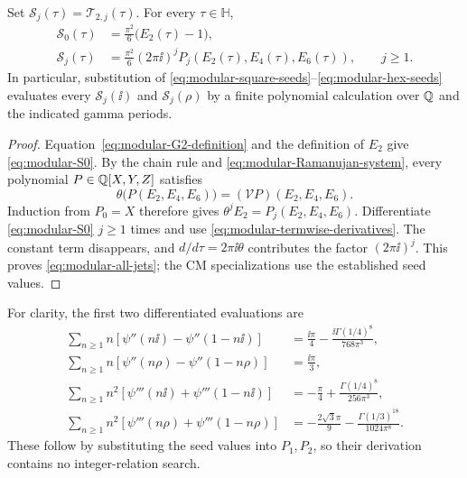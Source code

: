 \begin{theorem}
\label{thm:modular-all-jets}
Set \(\mathcal S_j(\tau)=\mathcal T_{2,j}(\tau)\). For every
\(\tau\in\mathbb H\),
\begin{align}
\mathcal S_0(\tau)&=\frac{\pi^2}{6}\bigl(E_2(\tau)-1\bigr),
\label{eq:modular-S0}\\
\mathcal S_j(\tau)&=\frac{\pi^2}{6}(2\pi\ii)^j
 P_j(E_2(\tau),E_4(\tau),E_6(\tau)),\qquad j\ge1.
\label{eq:modular-all-jets}
\end{align}
In particular, substitution of
\eqref{eq:modular-square-seeds}--\eqref{eq:modular-hex-seeds}
evaluates every \(\mathcal S_j(\ii)\) and
\(\mathcal S_j(\rho)\) by a finite polynomial calculation over
\(\mathbb{Q}\) and the indicated gamma periods.
\end{theorem}

\begin{proof}
Equation~\eqref{eq:modular-G2-definition} and the definition of
\(E_2\) give \eqref{eq:modular-S0}. By the chain rule and
\eqref{eq:modular-Ramanujan-system}, every polynomial
\(P\in\mathbb{Q}[X,Y,Z]\) satisfies
\[
\theta\bigl(P(E_2,E_4,E_6)\bigr)
=(\mathcal V P)(E_2,E_4,E_6).
\]
Induction from \(P_0=X\) therefore gives
\(\theta^jE_2=P_j(E_2,E_4,E_6)\).
Differentiate \eqref{eq:modular-S0} \(j\ge1\) times and use
\eqref{eq:modular-termwise-derivatives}. The constant term disappears,
and \(d/d\tau=2\pi\ii\theta\) contributes the factor
\((2\pi\ii)^j\). This proves \eqref{eq:modular-all-jets}; the CM
specializations use the established seed values.
\end{proof}

For clarity, the first two differentiated evaluations are
\begin{align}
\sum_{n\ge1}n\left[\psi''(n\ii)-\psi''(1-n\ii)\right]
 &=\frac{\ii\pi}{4}
   -\frac{\ii\Gamma(1/4)^8}{768\pi^3},
\label{eq:modular-S1-square}\\
\sum_{n\ge1}n\left[\psi''(n\rho)-\psi''(1-n\rho)\right]
 &=\frac{\ii\pi}{3},
\label{eq:modular-S1-hex}\\
\sum_{n\ge1}n^2\left[\psi'''(n\ii)+\psi'''(1-n\ii)\right]
 &=-\frac\pi4+\frac{\Gamma(1/4)^8}{256\pi^3},
\label{eq:modular-S2-square}\\
\sum_{n\ge1}n^2\left[\psi'''(n\rho)+\psi'''(1-n\rho)\right]
 &=-\frac{2\sqrt3\pi}{9}
   -\frac{\Gamma(1/3)^{18}}{1024\pi^8}.
\label{eq:modular-S2-hex}
\end{align}
These follow by substituting the seed values into \(P_1,P_2\), so
their derivation contains no integer-relation search.


